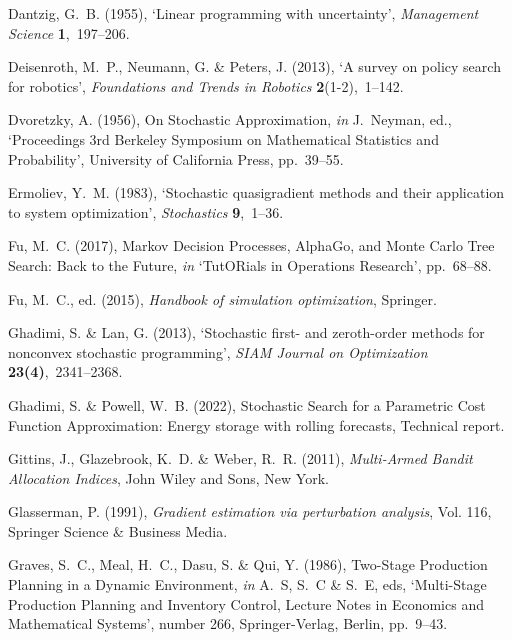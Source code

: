 \documentclass[11pt,oneside,fleqn,reqno,titlepage]{article}
\begin{document}
\begin{thebibliography}{xx}
Dantzig, G.~B.  (1955), `{Linear programming with uncertainty}', {\em
  Management Science} {\bf 1},~197--206.

Deisenroth, M.~P., Neumann, G. \& Peters, J.  (2013), `A survey on policy
  search for robotics', {\em Foundations and Trends in Robotics} {\bf
  2}(1-2),~1--142.

Dvoretzky, A.  (1956), {On Stochastic Approximation}, {\em in} J.~Neyman, ed.,
  `Proceedings 3rd Berkeley Symposium on Mathematical Statistics and
  Probability', University of California Press, pp.~39--55.

Ermoliev, Y.~M.  (1983), `{Stochastic quasigradient methods and their
  application to system optimization}', {\em Stochastics} {\bf 9},~1--36.

Fu, M.~C.  (2017), {Markov Decision Processes, AlphaGo, and Monte Carlo Tree
  Search: Back to the Future}, {\em in} `TutORials in Operations Research',
  pp.~68--88.

Fu, M.~C., ed.  (2015), {\em Handbook of simulation optimization}, Springer.

Ghadimi, S. \& Lan, G.  (2013), `Stochastic first- and zeroth-order methods for
  nonconvex stochastic programming', {\em SIAM Journal on Optimization} {\bf
  23(4)},~2341--2368.

Ghadimi, S. \& Powell, W.~B.  (2022), {Stochastic Search for a Parametric Cost
  Function Approximation: Energy storage with rolling forecasts}, Technical
  report.

Gittins, J., Glazebrook, K.~D. \& Weber, R.~R.  (2011), {\em {Multi-Armed
  Bandit Allocation Indices}}, John Wiley and Sons, New York.

Glasserman, P.  (1991), {\em Gradient estimation via perturbation analysis},
  Vol. 116, Springer Science \& Business Media.

Graves, S.~C., Meal, H.~C., Dasu, S. \& Qui, Y.  (1986), {Two-Stage Production
  Planning in a Dynamic Environment}, {\em in} A.~S, S.~C \& S.~E, eds,
  `Multi-Stage Production Planning and Inventory Control, Lecture Notes in
  Economics and Mathematical Systems', number 266, Springer-Verlag, Berlin,
  pp.~9--43.


\end{thebibliography}
\end{document}
